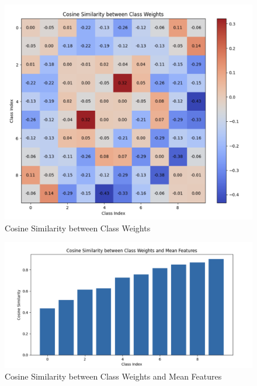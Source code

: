\documentclass{article}
\begin{document}
\begin{multicols}{2}
\columnbreak
\begin{figure}[H]
\centering
\includegraphics[width=\linewidth]{Plot/VS_res50/cos_res50.png}
\caption{Cosine Similarity between Class Weights}
\end{figure}
\begin{figure}[H]
\centering
\includegraphics[width=\linewidth]{Plot/VS_res50/Wi_Hi_res50.png}
\caption{Cosine Similarity between Class Weights and Mean Features}
\end{figure}

\end{multicols} %





\newpage
\end{document}
